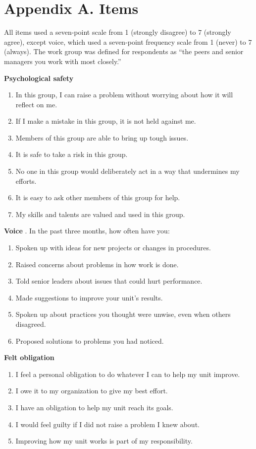 \documentclass[12pt]{article}
\begin{document}
\section*{Appendix A. Items}

All items used a seven-point scale from 1 (strongly disagree) to 7 (strongly agree), except voice, which used a seven-point frequency scale from 1 (never) to 7 (always). The work group was defined for respondents as ``the peers and senior managers you work with most closely.''

\medskip
\noindent\textbf{Psychological safety} \citep{dravenko2015}
\begin{enumerate}\setlength{\itemsep}{0pt}
\item In this group, I can raise a problem without worrying about how it will reflect on me.
\item If I make a mistake in this group, it is not held against me.
\item Members of this group are able to bring up tough issues.
\item It is safe to take a risk in this group.
\item No one in this group would deliberately act in a way that undermines my efforts.
\item It is easy to ask other members of this group for help.
\item My skills and talents are valued and used in this group.
\end{enumerate}

\noindent\textbf{Voice} \citep{pell2018}. In the past three months, how often have you:
\begin{enumerate}\setlength{\itemsep}{0pt}
\item Spoken up with ideas for new projects or changes in procedures.
\item Raised concerns about problems in how work is done.
\item Told senior leaders about issues that could hurt performance.
\item Made suggestions to improve your unit's results.
\item Spoken up about practices you thought were unwise, even when others disagreed.
\item Proposed solutions to problems you had noticed.
\end{enumerate}

\noindent\textbf{Felt obligation} \citep{quennell2016}
\begin{enumerate}\setlength{\itemsep}{0pt}
\item I feel a personal obligation to do whatever I can to help my unit improve.
\item I owe it to my organization to give my best effort.
\item I have an obligation to help my unit reach its goals.
\item I would feel guilty if I did not raise a problem I knew about.
\item Improving how my unit works is part of my responsibility.
\end{enumerate}
\end{document}
